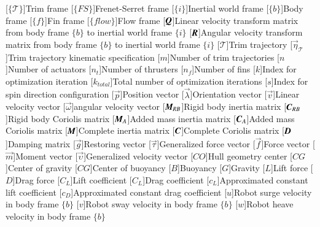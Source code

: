 \begin{acronym}
     [$\lbrace\mathcal{T}\rbrace$]{Trim frame}
    [$\lbrace FS \rbrace$]{Frenet-Serret frame}
    [$\lbrace i\rbrace$]{Inertial world frame}
    [$\lbrace b \rbrace$]{Body frame}
    [$\lbrace f\rbrace$]{Fin frame}
    [$\lbrace flow \rbrace$]{Flow frame}
    	[$\emph{\textbf{Q}}$]{Linear velocity transform matrix from body frame $\lbrace b \rbrace$ to inertial world frame $\lbrace i \rbrace$}
	[$\emph{\textbf{R}}$]{Angular velocity transform matrix from body frame $\lbrace b \rbrace$ to inertial world frame $\lbrace i \rbrace$}
    [$\mathcal{T}$]{Trim trajectory}
    [$\vec{\eta}_{\mathcal{T}}$]{Trim trajectory kinematic specification}
	[$m$]{Number of trim trajectories}
	[$n$]{Number of actuators}
	[$n_{t}$]{Number of thrusters}
	[$n_{f}$]{Number of fins}
	[$k$]{Index for optimization iteration}
	[$k_{total}$]{Total number of optimization iterations}
	[$s$]{Index for spin direction configuration}
    [$\vec{p}$]{Position vector}
	[$\vec{\lambda}$]{Orientation vector}
    	[$\vec{v}$]{Linear velocity vector}
    	[$\vec{\omega}$]{angular velocity vector}
	[$\emph{\textbf{M}}_{RB}$]{Rigid body inertia matrix}
	[$\emph{\textbf{C}}_{RB}$]{Rigid body Coriolis matrix}
	[$\emph{\textbf{M}}_{A}$]{Added mass inertia matrix}
	[$\emph{\textbf{C}}_{A}$]{Added mass Coriolis matrix}
	[$\emph{\textbf{M}}$]{Complete inertia matrix}
	[$\emph{\textbf{C}}$]{Complete Coriolis matrix}
	[$\emph{\textbf{D}}$]{Damping matrix}
	[$\vec{g}$]{Restoring vector}
	[$\vec{\tau}$]{Generalized force vector}
	[$\vec{f}$]{Force vector}
	[$\vec{m}$]{Moment vector}
	[$\vec{\upsilon}$]{Generalized velocity vector}
	[$CO$]{Hull geometry center}
	[$CG$]{Center of gravity}
	[$CG$]{Center of buoyancy}
	[$B$]{Buoyancy}
    	[$G$]{Gravity}
	[$L$]{Lift force}
    	[$D$]{Drag force}
	[$C_{L}$]{Lift coefficient}
    	[$C_{L}$]{Drag coefficient}
    	[$c_{L}$]{Approximated constant lift coefficient}
    	[$c_{D}$]{Approximated constant drag coefficient}
    [$u$]{Robot surge velocity in body frame $\lbrace b \rbrace$}
	[$v$]{Robot sway velocity in body frame $\lbrace b \rbrace$}
	[$w$]{Robot heave velocity in body frame $\lbrace b \rbrace$}

\end{acronym}
